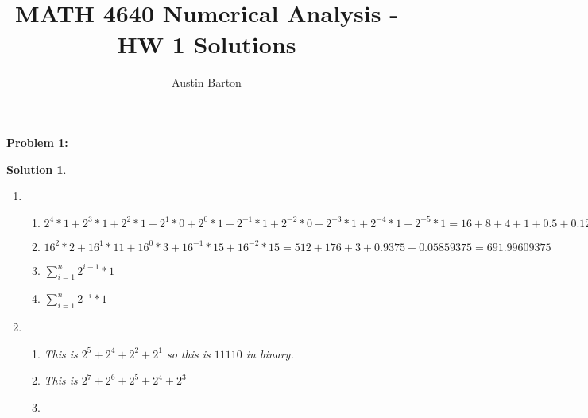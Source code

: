 \documentclass[12pt, letterpaper]{article}
\title{MATH 4640 Numerical Analysis - HW 1 Solutions}
\author{Austin Barton}
\theoremstyle{nonumberplain}
\newtheorem{sol}{Solution}
\begin{document}
\maketitle

\vspace{2em}
\hspace{18pt}\textbf{Problem 1:} \medskip
\begin{sol}
	\begin{enumerate}[label=\roman*.]
		\item
		      \begin{enumerate}[label=\alph*)]
			      \item $2^4 * 1 + 2^3 * 1 + 2^2 * 1 + 2^1 * 0 + 2^0 * 1 + 2^{-1} * 1 + 2^{-2} * 0 + 2^{-3} * 1 + 2^{-4} * 1 + 2^{-5} * 1 = 16 + 8 + 4 + 1 + 0.5 + 0.125 + 0.0625 +  0.03125 = 29.71875$
			      \item $16^2 * 2 + 16^1 * 11 + 16^0 * 3 + 16^{-1} * 15 + 16^{-2} * 15 = 512 + 176 + 3 + 0.9375 + 0.05859375 = 691.99609375$
			      \item $\sum_{i = 1}^n 2^{i-1} * 1$
			      \item $\sum_{i = 1}^n 2^{-i} * 1$
		      \end{enumerate}
		\item
		      \begin{enumerate}[label=\alph*)]
			      \item This is $2^5 + 2^4 + 2^2 + 2^1$ so this is $11110$ in binary.
			      \item This is $2^7 +2^6 + 2^5 + 2^4 + 2^3$
			      \item
		      \end{enumerate}
	\end{enumerate}
\end{sol}

\newpage
\end{document}

